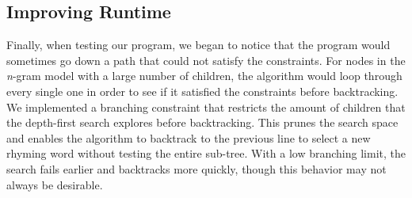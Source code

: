 \documentclass[10pt,twocolumn]{article}
\begin{document}
\subsection{Improving Runtime}
Finally, when testing our program, we began to notice that the program would sometimes go down a path that could not satisfy the constraints. For nodes in the \emph{n}-gram model with a large number of children, the algorithm would loop through every single one in order to see if it satisfied the constraints before backtracking. We implemented a branching constraint that restricts the amount of children that the depth-first search explores before backtracking. This prunes the search space and enables the algorithm to backtrack to the previous line to select a new rhyming word without testing the entire sub-tree. With a low branching limit, the search fails earlier and backtracks more quickly, though this behavior may not always be desirable. 
\end{document}
